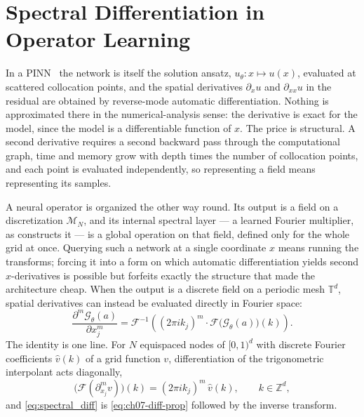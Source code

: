 \section{Spectral Differentiation in Operator Learning}

In a PINN~\cite{raissi2019physics} the network is itself the solution ansatz,
$u_\theta:x\mapsto u(x)$, evaluated at scattered collocation points, and the spatial
derivatives $\partial_x u$ and $\partial_{xx}u$ in the residual are obtained by reverse-mode
automatic differentiation. Nothing is approximated there in the numerical-analysis sense:
the derivative is exact for the model, since the model is a differentiable function of $x$.
The price is structural. A second derivative requires a second backward pass through the
computational graph, time and memory grow with depth times the number of collocation points,
and each point is evaluated independently, so representing a field means representing its
samples.

A neural operator is organized the other way round. Its output is a field on a discretization
$\mathcal{M}_N$, and its internal spectral layer --- a learned Fourier multiplier, as
 constructs it --- is a global
operation on that field, defined only for the whole grid at once. Querying such a network at
a single coordinate $x$ means running the transforms; forcing it into a form on which
automatic differentiation yields second $x$-derivatives is possible but forfeits exactly the
structure that made the architecture cheap. When the output is a discrete field on a periodic
mesh $\mathbb{T}^d$, spatial derivatives can instead be evaluated directly in Fourier space:
\begin{equation}
  \label{eq:spectral_diff}
  \frac{\partial^m \mathcal{G}_\theta(a)}{\partial x_j^m} = \mathcal{F}^{-1} \left( (2\pi i k_j)^m \cdot \mathcal{F}\big( \mathcal{G}_\theta(a) \big)(k) \right).
\end{equation}
The identity is one line. For $N$ equispaced nodes of $[0,1)^d$ with discrete Fourier
coefficients $\hat v(k)$ of a grid function $v$, differentiation of the trigonometric
interpolant acts diagonally,
\begin{equation}
  \label{eq:ch07-diff-prop}
  \big(\mathcal{F}(\partial_{x_j}^{m} v)\big)(k) = (2\pi i k_j)^{m}\,\hat v(k),
  \qquad k\in\mathbb{Z}^{d},
\end{equation}
and \eqref{eq:spectral_diff} is \eqref{eq:ch07-diff-prop} followed by the inverse transform.


